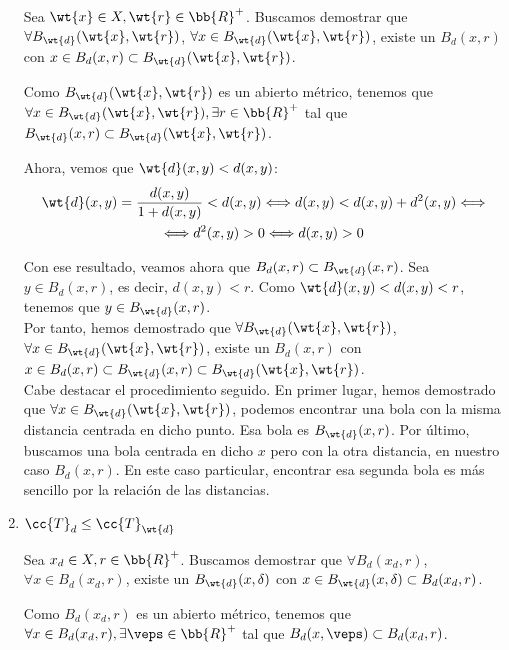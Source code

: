 \begin{ejercicio}
\begin{enumerate}
        Sea $\wt{x}\in X, \wt{r}\in \bb{R}^+$. Buscamos demostrar que $\forall B_{\wt{d}}(\wt{x}, \wt{r})$, $\forall x\in B_{\wt{d}}(\wt{x}, \wt{r})$, existe un $B_d(x,r)$ con $x\in B_d(x,r)\subset B_{\wt{d}}(\wt{x}, \wt{r})$.

        Como $B_{\wt{d}}(\wt{x}, \wt{r})$ es un abierto métrico, tenemos que $\forall x\in B_{\wt{d}}(\wt{x}, \wt{r}), \exists r\in \bb{R}^+$ tal que $B_{\wt{d}}(x,r)\subset B_{\wt{d}}(\wt{x}, \wt{r})$.

        Ahora, vemos que $\wt{d}(x,y)<d(x,y)$:
        \begin{multline*}
            \wt{d}(x,y) = \frac{d(x,y)}{1+d(x,y)}<d(x,y) 
            \Longleftrightarrow 
            d(x,y)<d(x,y) + d^2(x,y)
            \Longleftrightarrow\\\Longleftrightarrow  d^2(x,y)>0 \Longleftrightarrow d(x,y)>0
        \end{multline*}
        
        Con ese resultado, veamos ahora que $B_d(x,r)\subset B_{\wt{d}}(x,r)$. Sea $y\in B_d(x,r)$, es decir, $d(x,y)<r$. Como $\wt{d}(x,y)<d(x,y)<r$, tenemos que $y\in B_{\wt{d}}(x,r)$.\\

        Por tanto, hemos demostrado que $\forall B_{\wt{d}}(\wt{x}, \wt{r})$, $\forall x\in B_{\wt{d}}(\wt{x}, \wt{r})$, existe un $B_d(x,r)$ con $x\in B_d(x,r)\subset B_{\wt{d}}(x, r)\subset B_{\wt{d}}(\wt{x}, \wt{r})$.\\

        Cabe destacar el procedimiento seguido. En primer lugar, hemos demostrado que $\forall x\in B_{\wt{d}}(\wt{x}, \wt{r})$, podemos encontrar una bola con la misma distancia centrada en dicho punto. Esa bola es $B_{\wt{d}}(x, r)$. Por último, buscamos una bola centrada en dicho $x$ pero con la otra distancia, en nuestro caso $B_d(x,r)$. En este caso particular, encontrar esa segunda bola es más sencillo por la relación de las distancias.

        \item \ul{$\cc{T}_d\leq \cc{T}_{\wt{d}}$}

        Sea $x_d\in X, r\in \bb{R}^+$. Buscamos demostrar que $\forall B_{d}(x_d, r)$, $\forall x\in B_{d}(x_d, r)$, existe un $B_{\wt{d}}(x,\delta)$ con $x\in B_{\wt{d}}(x,\delta)\subset B_{d}(x_d, r)$.

        Como $B_{d}(x_d, r)$ es un abierto métrico, tenemos que $\forall x\in B_{d}(x_d, r), \exists \veps\in \bb{R}^+$ tal que $B_{d}(x,\veps)\subset B_{d}(x_d, r)$.


\end{enumerate}
\end{ejercicio}
